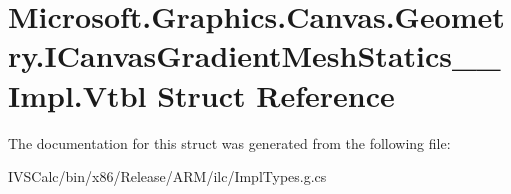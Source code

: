 \hypertarget{struct_microsoft_1_1_graphics_1_1_canvas_1_1_geometry_1_1_i_canvas_gradient_mesh_statics_____impl_1_1_vtbl}{}\section{Microsoft.\+Graphics.\+Canvas.\+Geometry.\+I\+Canvas\+Gradient\+Mesh\+Statics\+\_\+\+\_\+\+Impl.\+Vtbl Struct Reference}
\label{struct_microsoft_1_1_graphics_1_1_canvas_1_1_geometry_1_1_i_canvas_gradient_mesh_statics_____impl_1_1_vtbl}


The documentation for this struct was generated from the following file\+:\begin{DoxyCompactItemize}
\item 
I\+V\+S\+Calc/bin/x86/\+Release/\+A\+R\+M/ilc/Impl\+Types.\+g.\+cs\end{DoxyCompactItemize}
